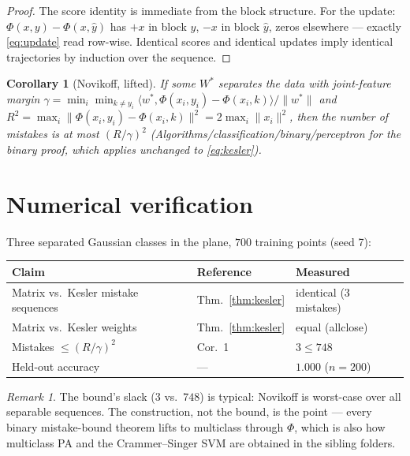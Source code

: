 \documentclass[11pt]{article}
\newtheorem{corollary}{Corollary}
\theoremstyle{remark}
\newtheorem{remark}{Remark}
\begin{document}
\begin{proof}
The score identity is immediate from the block structure. For the
update: $\Phi(x,y) - \Phi(x,\hat y)$ has $+x$ in block $y$, $-x$ in
block $\hat y$, zeros elsewhere --- exactly \eqref{eq:update} read
row-wise. Identical scores and identical updates imply identical
trajectories by induction over the sequence.
\end{proof}

\begin{corollary}[Novikoff, lifted]
If some $W^*$ separates the data with joint-feature margin
$\gamma = \min_i \min_{k \ne y_i}
\langle w^*, \Phi(x_i,y_i) - \Phi(x_i,k)\rangle / \|w^*\|$ and
$R^2 = \max_i \|\Phi(x_i,y_i) - \Phi(x_i,k)\|^2 = 2\max_i\|x_i\|^2$,
then the number of mistakes is at most $(R/\gamma)^2$
(Algorithms/classification/binary/perceptron for the binary proof,
which applies unchanged to \eqref{eq:kesler}).
\end{corollary}

\section{Numerical verification}

Three separated Gaussian classes in the plane, $700$ training points
(seed 7):

\begin{center}
\begin{tabular}{lll}
\toprule
Claim & Reference & Measured\\
\midrule
Matrix vs.\ Kesler mistake sequences & Thm.~\ref{thm:kesler}
  & identical (3 mistakes)\\
Matrix vs.\ Kesler weights & Thm.~\ref{thm:kesler} & equal
  (allclose)\\
Mistakes $\le (R/\gamma)^2$ & Cor.~1 & $3 \le 748$\\
Held-out accuracy & --- & $1.000$ ($n = 200$)\\
\bottomrule
\end{tabular}
\end{center}

\begin{remark}
The bound's slack ($3$ vs.\ $748$) is typical: Novikoff is
worst-case over all separable sequences. The construction, not the
bound, is the point --- every binary mistake-bound theorem lifts to
multiclass through $\Phi$, which is also how multiclass PA and the
Crammer--Singer SVM are obtained in the sibling folders.
\end{remark}
\end{document}
